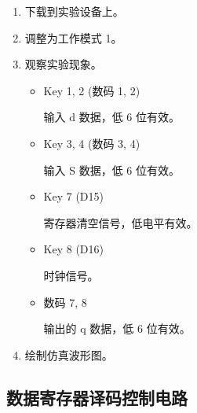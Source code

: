 \begin{enumerate}
    \item 下载到实验设备上。
    \item 调整为工作模式 1。
    \item 观察实验现象。
    
    \begin{itemize}
        \item Key 1, 2 (数码 1, 2)
        
        输入 d 数据，低 6 位有效。
        
        \item Key 3, 4 (数码 3, 4)
        
        输入 S 数据，低 6 位有效。
        
        \item Key 7 (D15)
        
        寄存器清空信号，低电平有效。
        
        \item Key 8 (D16)
        
        时钟信号。
        
        \item 数码 7, 8
        
        输出的 q 数据，低 6 位有效。
        
    \end{itemize}
    \item 绘制仿真波形图。
\end{enumerate}

\subsection{数据寄存器译码控制电路}

